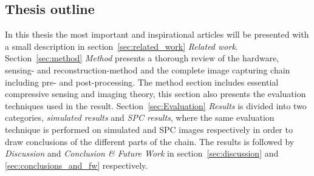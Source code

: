 \subsection{Thesis outline}
In this thesis the most important and inspirational articles will be presented with a small description in section~\ref{sec:related_work} \textit{Related work}. Section~\ref{sec:method} \textit{Method} presents a thorough review of the hardware, sensing- and reconstruction-method and the complete image capturing chain including pre- and post-processing. The method section includes essential compressive sensing and imaging theory, this section also presents the evaluation techniques used in the result. Section~\ref{sec:Evaluation} \textit{Results} is divided into two categories, \textit{simulated results} and \textit{SPC results}, where the same evaluation technique is performed on simulated and SPC images respectively in order to draw conclusions of the different parts of the chain. The results is followed by \textit{Discussion} and \textit{Conclusion \& Future Work} in section~\ref{sec:discussion} and \ref{sec:conclusions_and_fw} respectively. 
